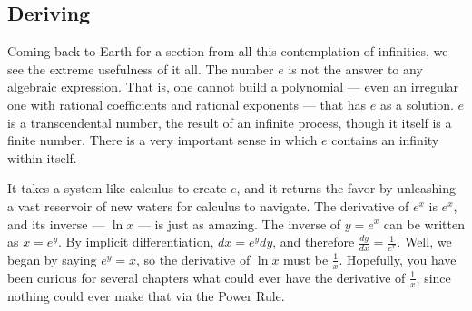 
\subsection{Deriving}



Coming back to Earth for a section from all this contemplation of infinities, we see the
extreme usefulness of it all.  The number $e$ is not the answer to any algebraic 
expression.  That is, one cannot build a polynomial --- even an irregular one with
rational coefficients and rational exponents --- that has $e$ as a solution.  $e$ is a
transcendental number, the result of an infinite process, though it itself is a finite number.
There is a very important sense in which $e$ contains an infinity within itself.

It takes a system like calculus to create $e$, and it returns the favor by unleashing a
vast reservoir of new waters for calculus to navigate.  The derivative of $e^x$ is $e^x$,
and its inverse --- $\ln{x}$ --- is just as amazing.  The inverse of $y=e^x$ can be written
as $x=e^y$.  By implicit differentiation, $dx = e^ydy$, and therefore $\frac{dy}{dx} =
\frac{1}{e^x}$.  Well, we began by saying $e^y=x$, so the derivative of $\ln{x}$ must
be $\frac{1}{x}$.  Hopefully, you have been curious for several chapters what
could ever have the derivative of $\frac{1}{x}$, since nothing could ever make that
via the Power Rule.


